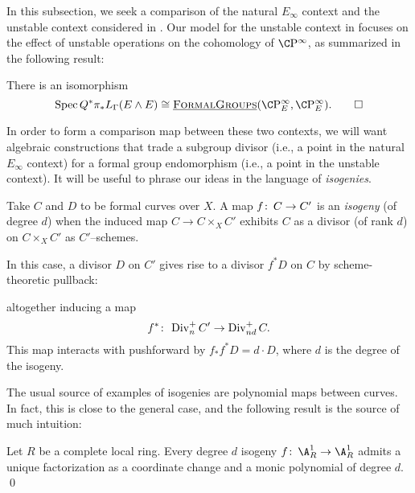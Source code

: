In this subsection, we seek a comparison of the natural $E_\infty$ context and the unstable context considered in .  Our model for the unstable context in  focuses on the effect of unstable operations on the cohomology of $\CP^\infty$, as summarized in the following result:

\begin{lemma}\label{UnstableEthyCooperations}
There is an isomorphism \[\Spec Q^* \pi_* L_\Gamma(E \sm E) \cong \InternalHom{FormalGroups}(\CP^\infty_E, \CP^\infty_E). \qed\]
\end{lemma}

\noindent In order to form a comparison map between these two contexts, we will want algebraic constructions that trade a subgroup divisor (i.e., a point in the natural $E_\infty$ context) for a formal group endomorphism (i.e., a point in the unstable context).  It will be useful to phrase our ideas in the language of \textit{isogenies}.

\begin{definition}
Take $C$ and $D$ to be formal curves over $X$.  A map $f\colon\thinspace C \to C'$ is an \textit{isogeny} (of degree $d$) when the induced map $C \to C \times_X C'$ exhibits $C$ as a divisor (of rank $d$) on $C \times_X C'$ as $C'$--schemes.
\end{definition}

\begin{remark}
In this case, a divisor $D$ on $C'$ gives rise to a divisor $f^* D$ on $C$ by scheme-theoretic pullback:
\begin{center}
\end{center}
altogether inducing a map \[f^*\colon\thinspace \operatorname{Div}_n^+ C' \to \operatorname{Div}_{nd}^+ C.\]  This map interacts with pushforward by $f_* f^* D = d \cdot D$, where $d$ is the degree of the isogeny.
\end{remark}

The usual source of examples of isogenies are polynomial maps between curves.  In fact, this is close to the general case, and the following result is the source of much intuition:
\begin{lemma}
Let $R$ be a complete local ring.  Every degree $d$ isogeny $f\co \A^1_R \to \A^1_R$ admits a unique factorization as a coordinate change and a monic polynomial of degree $d$. \qed
\end{lemma}

